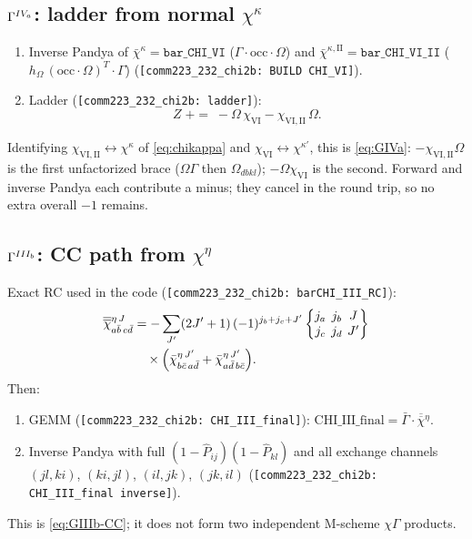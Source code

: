 \documentclass[enabledeprecatedfontcommands]{scrartcl}
\newcommand{\coderef}[1]{\textcolor{codeblue}{\texttt{[#1]}}}
\newcommand{\MyRomanNum}[1]{%
  \ifcase#1\or I\or II\or III\or IV\or V\or VI\or VII\or VIII\or IX\or X\else #1\fi}
\newcommand{\sixj}[6]{\begingroup\setlength{\arraycolsep}{0.2em}%
  \begin{Bmatrix} #1 & #2 & #3 \\ #4 & #5 & #6 \end{Bmatrix}\endgroup}
\begin{document}
\subsection{$\Gamma^{\MyRomanNum{4}_a}$: ladder from normal $\chi^\kappa$}
\label{sec:code-GIVa}

\begin{enumerate}
  \item Inverse Pandya of $\bar\chi^\kappa=\mathtt{bar\_CHI\_VI}$
    ($\Gamma\cdot\mathrm{occ}\cdot\Omega$) and
    $\bar\chi^{\kappa,\mathrm{II}}=\mathtt{bar\_CHI\_VI\_II}$
    ($h_\Omega\,(\mathrm{occ}\cdot\Omega)^{T}\cdot\Gamma$)
    (\coderef{comm223\_232\_chi2b: BUILD CHI\_VI}).
  \item Ladder (\coderef{comm223\_232\_chi2b: ladder}):
  \begin{equation}
    Z\;{+}{=}\;
    -\Omega\,\chi_{\mathrm{VI}}
    -\chi_{\mathrm{VI,II}}\,\Omega.
  \end{equation}
\end{enumerate}
Identifying $\chi_{\mathrm{VI,II}}\leftrightarrow\chi^\kappa$ of
\eqref{eq:chikappa} and $\chi_{\mathrm{VI}}\leftrightarrow\chi^{\kappa'}$,
this is \eqref{eq:GIVa}:
$-\chi_{\mathrm{VI,II}}\Omega$ is the first unfactorized brace
($\Omega\Gamma$ then $\Omega_{dbkl}$);
$-\Omega\chi_{\mathrm{VI}}$ is the second.
Forward and inverse Pandya each contribute a minus; they cancel in the
round trip, so no extra overall $-1$ remains.

\subsection{$\Gamma^{\MyRomanNum{3}_b}$: CC path from $\chi^\eta$}
\label{sec:code-GIIIb}

Exact RC used in the code (\coderef{comm223\_232\_chi2b: barCHI\_III\_RC}):
\begin{equation}
\begin{aligned}
\overline{\overline\chi}{}^{\eta\,J}_{a\bar b\,c\bar d}
&=-\sum_{J'}(2J'+1)\,(-1)^{j_b+j_c+J'}
  \sixj{j_a}{j_b}{J}{j_c}{j_d}{J'}\\
&\quad\times\Bigl(
  \bar\chi^{\eta\,J'}_{b\bar c\,a\bar d}
 +\bar\chi^{\eta\,J'}_{a\bar d\,b\bar c}
\Bigr).
\end{aligned}
\end{equation}
Then:
\begin{enumerate}
  \item GEMM (\coderef{comm223\_232\_chi2b: CHI\_III\_final}):
    $\mathrm{CHI\_III\_final}=\bar\Gamma\cdot\overline{\overline\chi}{}^\eta$.
  \item Inverse Pandya with full $(1-\hat P_{ij})(1-\hat P_{kl})$ and all
    exchange channels $(jl,ki)$, $(ki,jl)$, $(il,jk)$, $(jk,il)$
    (\coderef{comm223\_232\_chi2b: CHI\_III\_final inverse}).
\end{enumerate}
This is \eqref{eq:GIIIb-CC}; it does not form two independent M-scheme
$\chi\Gamma$ products.
\end{document}
